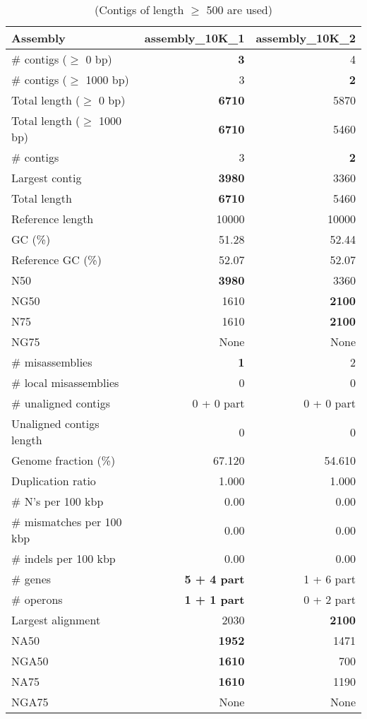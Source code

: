 \documentclass[12pt,a4paper]{article}
\begin{document}
\begin{table}[ht]
\begin{center}
\caption{(Contigs of length $\geq$ 500 are used)}
\begin{tabular}{|l*{2}{|r}|}
\hline
Assembly & assembly\_10K\_1 & assembly\_10K\_2 \\ \hline
\# contigs ($\geq$ 0 bp) & {\bf 3} & 4 \\ \hline
\# contigs ($\geq$ 1000 bp) & 3 & {\bf 2} \\ \hline
Total length ($\geq$ 0 bp) & {\bf 6710} & 5870 \\ \hline
Total length ($\geq$ 1000 bp) & {\bf 6710} & 5460 \\ \hline
\# contigs & 3 & {\bf 2} \\ \hline
Largest contig & {\bf 3980} & 3360 \\ \hline
Total length & {\bf 6710} & 5460 \\ \hline
Reference length & 10000 & 10000 \\ \hline
GC (\%) & 51.28 & 52.44 \\ \hline
Reference GC (\%) & 52.07 & 52.07 \\ \hline
N50 & {\bf 3980} & 3360 \\ \hline
NG50 & 1610 & {\bf 2100} \\ \hline
N75 & 1610 & {\bf 2100} \\ \hline
NG75 & None & None \\ \hline
\# misassemblies & {\bf 1} & 2 \\ \hline
\# local misassemblies & 0 & 0 \\ \hline
\# unaligned contigs & 0 + 0 part & 0 + 0 part \\ \hline
Unaligned contigs length & 0 & 0 \\ \hline
Genome fraction (\%) & 67.120 & 54.610 \\ \hline
Duplication ratio & 1.000 & 1.000 \\ \hline
\# N's per 100 kbp & 0.00 & 0.00 \\ \hline
\# mismatches per 100 kbp & 0.00 & 0.00 \\ \hline
\# indels per 100 kbp & 0.00 & 0.00 \\ \hline
\# genes & {\bf 5 + 4 part} & 1 + 6 part \\ \hline
\# operons & {\bf 1 + 1 part} & 0 + 2 part \\ \hline
Largest alignment & 2030 & {\bf 2100} \\ \hline
NA50 & {\bf 1952} & 1471 \\ \hline
NGA50 & {\bf 1610} & 700 \\ \hline
NA75 & {\bf 1610} & 1190 \\ \hline
NGA75 & None & None \\ \hline
\end{tabular}
\end{center}
\end{table}
\end{document}
